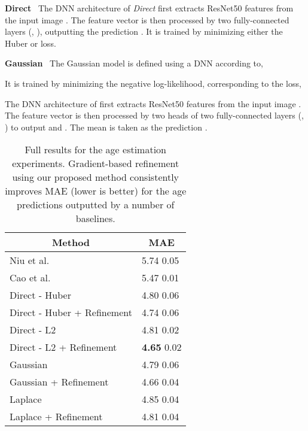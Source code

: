 \documentclass[runningheads]{llncs}
\newcommand{\parsection}[1]{\noindent\textbf{#1}~ }
\begin{document}
\begin{appendices}
\parsection{Direct}
The DNN architecture of \textit{Direct} first extracts ResNet50 features  from the input image . The feature vector  is then processed by two fully-connected layers (, ), outputting the prediction . It is trained by minimizing either the Huber or  loss.

\parsection{Gaussian}
The Gaussian model is defined using a DNN  according to,

It is trained by minimizing the negative log-likelihood, corresponding to the loss,

The DNN architecture of  first extracts ResNet50 features  from the input image . The feature vector  is then processed by two heads of two fully-connected layers (, ) to output  and . The mean  is taken as the prediction .

\begin{table}[t]
\begin{center}
\caption{Full results for the age estimation experiments. Gradient-based refinement using our proposed method consistently improves MAE (lower is better) for the age predictions outputted by a number of baselines.}
\begin{tabular}{|l||l|}
\multicolumn{1}{c}{Method} &\multicolumn{1}{c}{MAE}\\ 
\hline
Niu et al. \cite{niu2016ordinal}            &5.74  0.05\\
Cao et al. \cite{cao2019consistent}      &5.47  0.01 \\

\hline













Direct - Huber                        &4.80  0.06 \\
Direct - Huber + Refinement           &4.74  0.06 \\
\hline

Direct - L2                        &4.81  0.02 \\
Direct - L2 + Refinement            &\textbf{4.65}  0.02 \\
\hline

Gaussian                                   &4.79  0.06 \\
Gaussian + Refinement                      &4.66  0.04 \\
\hline

Laplace                                 &4.85  0.04 \\
Laplace + Refinement                    &4.81  0.04 \\
\hline


\end{tabular}
\end{center}
\end{table}
\end{appendices}
\end{document}

